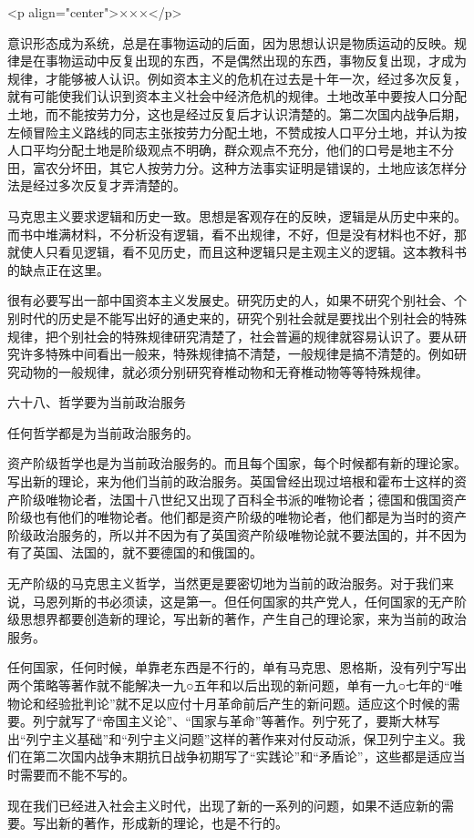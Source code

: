 <p align="center">×××</p>

意识形态成为系统，总是在事物运动的后面，因为思想认识是物质运动的反映。规律是在事物运动中反复出现的东西，不是偶然出现的东西，事物反复出现，才成为规律，才能够被人认识。例如资本主义的危机在过去是十年一次，经过多次反复，就有可能使我们认识到资本主义社会中经济危机的规律。土地改革中要按人口分配土地，而不能按劳力分，这也是经过反复后才认识清楚的。第二次国内战争后期，左倾冒险主义路线的同志主张按劳力分配土地，不赞成按人口平分土地，并认为按人口平均分配土地是阶级观点不明确，群众观点不充分，他们的口号是地主不分田，富农分坏田，其它人按劳力分。这种方法事实证明是错误的，土地应该怎样分法是经过多次反复才弄清楚的。

马克思主义要求逻辑和历史一致。思想是客观存在的反映，逻辑是从历史中来的。而书中堆满材料，不分析没有逻辑，看不出规律，不好，但是没有材料也不好，那就使人只看见逻辑，看不见历史，而且这种逻辑只是主观主义的逻辑。这本教科书的缺点正在这里。

很有必要写出一部中国资本主义发展史。研究历史的人，如果不研究个别社会、个别时代的历史是不能写出好的通史来的，研究个别社会就是要找出个别社会的特殊规律，把个别社会的特殊规律研究清楚了，社会普遍的规律就容易认识了。要从研究许多特殊中间看出一般来，特殊规律搞不清楚，一般规律是搞不清楚的。例如研究动物的一般规律，就必须分别研究脊椎动物和无脊椎动物等等特殊规律。

六十八、哲学要为当前政治服务

任何哲学都是为当前政治服务的。

资产阶级哲学也是为当前政治服务的。而且每个国家，每个时候都有新的理论家。写出新的理论，来为他们当前的政治服务。英国曾经出现过培根和霍布士这样的资产阶级唯物论者，法国十八世纪又出现了百科全书派的唯物论者；德国和俄国资产阶级也有他们的唯物论者。他们都是资产阶级的唯物论者，他们都是为当时的资产阶级政治服务的，所以并不因为有了英国资产阶级唯物论就不要法国的，并不因为有了英国、法国的，就不要德国的和俄国的。

无产阶级的马克思主义哲学，当然更是要密切地为当前的政治服务。对于我们来说，马恩列斯的书必须读，这是第一。但任何国家的共产党人，任何国家的无产阶级思想界都要创造新的理论，写出新的著作，产生自己的理论家，来为当前的政治服务。

任何国家，任何时候，单靠老东西是不行的，单有马克思、恩格斯，没有列宁写出两个策略等著作就不能解决一九○五年和以后出现的新问题，单有一九○七年的“唯物论和经验批判论”就不足以应付十月革命前后产生的新问题。适应这个时候的需要。列宁就写了“帝国主义论”、“国家与革命”等著作。列宁死了，要斯大林写出“列宁主义基础”和“列宁主义问题”这样的著作来对付反动派，保卫列宁主义。我们在第二次国内战争末期抗日战争初期写了“实践论”和“矛盾论”，这些都是适应当时需要而不能不写的。

现在我们已经进入社会主义时代，出现了新的一系列的问题，如果不适应新的需要。写出新的著作，形成新的理论，也是不行的。


